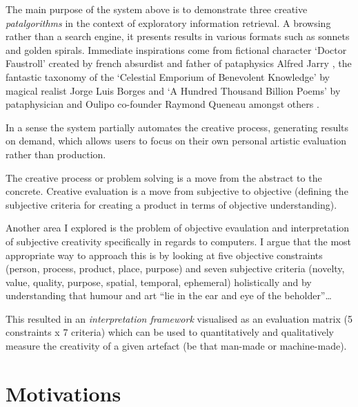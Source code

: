 The main purpose of the system above is to demonstrate three creative \textit{patalgorithms} in the context of exploratory information retrieval. A browsing rather than a search engine, it presents results in various formats such as sonnets and golden spirals. Immediate inspirations come from fictional character `Doctor Faustroll' created by french absurdist and father of pataphysics Alfred Jarry \autocite{Jarry1996}, the fantastic taxonomy of the `Celestial Emporium of Benevolent Knowledge' by magical realist Jorge Luis Borges \autocite{Borges2000} and `A Hundred Thousand Billion Poems' by pataphysician and Oulipo co-founder Raymond Queneau amongst others \autocite{Queneau1961}.

In a sense the system partially automates the creative process, generating results on demand, which allows users to focus on their own personal artistic evaluation rather than production.


\begin{draft}
  The creative process or problem solving is a move from the abstract to the concrete. Creative evaluation is a move from subjective to objective (defining the subjective criteria for creating a product in terms of objective understanding).
\end{draft}

Another area I explored is the problem of objective evaulation and interpretation of subjective creativity specifically in regards to computers. I argue that the most appropriate way to approach this is by looking at five objective constraints (person, process, product, place, purpose) and seven subjective criteria (novelty, value, quality, purpose, spatial, temporal, ephemeral) holistically and by understanding that humour and art ``lie in the ear and eye of the beholder''\ldots

This resulted in an \emph{interpretation framework} visualised as an evaluation matrix (5 constraints x 7 criteria) which can be used to quantitatively and qualitatively measure the creativity of a given artefact (be that man-made or machine-made).


\section{Motivations}

